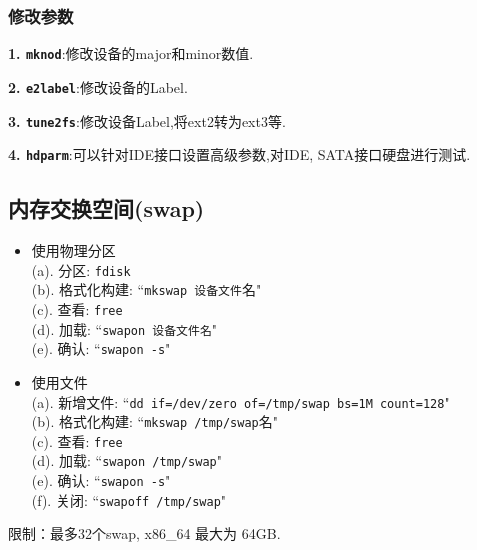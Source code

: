 \subsubsection{修改参数}
\par
\textbf{1. \texttt{mknod}}:修改设备的major和minor数值.

\par
\textbf{2. \texttt{e2label}}:修改设备的Label.

\par
\textbf{3. \texttt{tune2fs}}:修改设备Label,将ext2转为ext3等.

\par
\textbf{4. \texttt{hdparm}}:可以针对IDE接口设置高级参数,对IDE, SATA接口硬盘进行测试.

\subsection{内存交换空间(swap)}
\begin{itemize}
    \item 使用物理分区\\
    {\kaishu
    (a). 分区: \texttt{fdisk} \\
    (b). 格式化构建: ``\texttt{mkswap 设备文件}名" \\
    (c). 查看: \texttt{free} \\
    (d). 加载: ``\texttt{swapon 设备文件名}" \\
    (e). 确认: ``\texttt{swapon -s}"
    }

    \item 使用文件\\
    {\kaishu
    (a). 新增文件: ``\texttt{dd if=/dev/zero of=/tmp/swap bs=1M count=128}" \\
    (b). 格式化构建: ``\texttt{mkswap /tmp/swap}名" \\
    (c). 查看: \texttt{free} \\
    (d). 加载: ``\texttt{swapon /tmp/swap}" \\
    (e). 确认: ``\texttt{swapon -s}" \\
    (f). 关闭: ``\texttt{swapoff /tmp/swap}"
    }
\end{itemize}
限制：最多32个swap, x86\_64 最大为 64GB.
